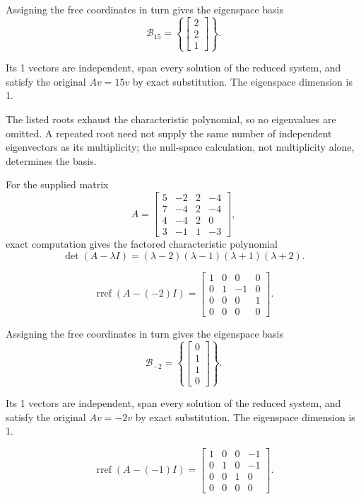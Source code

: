 Assigning the free coordinates in turn gives the eigenspace basis
\[ \mathcal B_{15}=\left\{\begin{bmatrix}2\\2\\1\end{bmatrix}\right\}.\]

Its 1 vectors are independent, span every solution of the reduced system, and satisfy the original $Av=15v$ by exact substitution. The eigenspace dimension is 1.

The listed roots exhaust the characteristic polynomial, so no eigenvalues are omitted. A repeated root need not supply the same number of independent eigenvectors as its multiplicity; the null-space calculation, not multiplicity alone, determines the basis.

For the supplied matrix
\[ A=\begin{bmatrix}5 & -2 & 2 & -4\\7 & -4 & 2 & -4\\4 & -4 & 2 & 0\\3 & -1 & 1 & -3\end{bmatrix},\]
exact computation gives the factored characteristic polynomial
\[ \det(A-\lambda I)=\left(\lambda - 2\right) \left(\lambda - 1\right) \left(\lambda + 1\right) \left(\lambda + 2\right).\]

\[ \operatorname{rref}(A-(-2)I)=\begin{bmatrix}1 & 0 & 0 & 0\\0 & 1 & -1 & 0\\0 & 0 & 0 & 1\\0 & 0 & 0 & 0\end{bmatrix}.\]

Assigning the free coordinates in turn gives the eigenspace basis
\[ \mathcal B_{-2}=\left\{\begin{bmatrix}0\\1\\1\\0\end{bmatrix}\right\}.\]

Its 1 vectors are independent, span every solution of the reduced system, and satisfy the original $Av=-2v$ by exact substitution. The eigenspace dimension is 1.

\[ \operatorname{rref}(A-(-1)I)=\begin{bmatrix}1 & 0 & 0 & -1\\0 & 1 & 0 & -1\\0 & 0 & 1 & 0\\0 & 0 & 0 & 0\end{bmatrix}.\]

